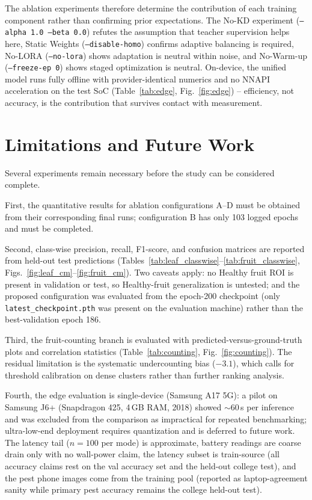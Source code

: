 \documentclass[preprint,12pt]{elsarticle}
\begin{document}
The ablation experiments therefore determine the contribution of each
training component rather than confirming prior expectations. The No-KD
experiment (\texttt{--alpha 1.0 --beta 0.0}) refutes the assumption
that teacher supervision helps here, Static Weights
(\texttt{--disable-homo}) confirms adaptive balancing is required,
No-LORA (\texttt{--no-lora}) shows adaptation is neutral within noise,
and No-Warm-up (\texttt{--freeze-ep 0}) shows staged optimization is
neutral. On-device, the unified model runs fully offline with
provider-identical numerics and no NNAPI acceleration on the test SoC
(Table~\ref{tab:edge}, Fig.~\ref{fig:edge}) -- efficiency, not
accuracy, is the contribution that survives contact with measurement.


\section{Limitations and Future Work}
\label{sec:limitations}

Several experiments remain necessary before the study can be considered
complete.

First, the quantitative results for ablation configurations A--D must
be obtained from their corresponding final runs; configuration B has
only 103 logged epochs and must be completed.

Second, class-wise precision, recall, F1-score, and confusion matrices
are reported from held-out test predictions
(Tables~\ref{tab:leaf_classwise}--\ref{tab:fruit_classwise},
Figs.~\ref{fig:leaf_cm}--\ref{fig:fruit_cm}). Two caveats apply: no
Healthy fruit ROI is present in validation or test, so Healthy-fruit
generalization is untested; and the proposed configuration was
evaluated from the epoch-200 checkpoint (only
\texttt{latest\_checkpoint.pth} was present on the evaluation
machine) rather than the best-validation epoch 186.

Third, the fruit-counting branch is evaluated with
predicted-versus-ground-truth plots and correlation statistics
(Table~\ref{tab:counting}, Fig.~\ref{fig:counting}). The residual
limitation is the systematic undercounting bias ($-3.1$), which calls
for threshold calibration on dense clusters rather than further
ranking analysis.

Fourth, the edge evaluation is single-device (Samsung A17 5G):
a pilot on Samsung J6+ (Snapdragon 425, 4\,GB RAM, 2018) showed
${\sim}60$\,s per inference and was excluded from the comparison as
impractical for repeated benchmarking; ultra-low-end deployment
requires quantization and is deferred to future work. The latency tail
($n{=}100$ per mode) is approximate, battery readings are coarse drain
only with no wall-power claim, the latency subset is train-source (all
accuracy claims rest on the val accuracy set and the held-out college
test), and the pest phone images come from the training pool (reported
as laptop-agreement sanity while primary pest accuracy remains the
college held-out test).
\end{document}
